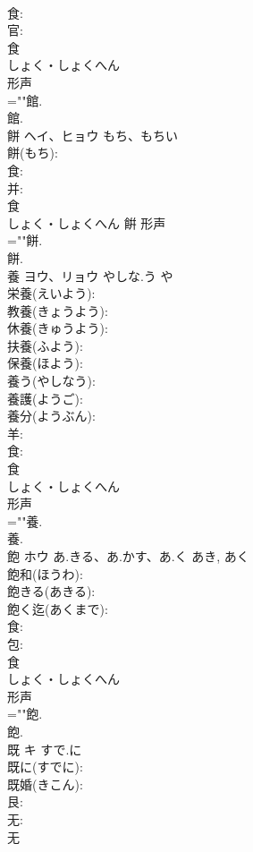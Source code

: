 \documentclass[8pt]{extreport}
\begin{document}
\begin{CJK}{UTF8}{min}
\\	食: 
\\	官: 
\\	食	
\\	しょく・しょくへん	
\\	形声 
\\	=""館.
\\	館.
\\	餅	ヘイ、ヒョウ	もち、もちい		
\\	餅(もち): 
\\	食: 
\\	并: 
\\	食	
\\	しょく・しょくへん	餠	形声 
\\	=""餅.
\\	餅.
\\	養	ヨウ、リョウ	やしな.う	や	
\\	栄養(えいよう): 
\\	教養(きょうよう): 
\\	休養(きゅうよう): 
\\	扶養(ふよう): 
\\	保養(ほよう): 
\\	養う(やしなう): 
\\	養護(ようご): 
\\	養分(ようぶん): 
\\	羊: 
\\	食: 
\\	食	
\\	しょく・しょくへん	
\\	形声 
\\	=""養.
\\	養.
\\	飽	ホウ	あ.きる、あ.かす、あ.く	あき, あく	
\\	飽和(ほうわ): 
\\	飽きる(あきる): 
\\	飽く迄(あくまで): 
\\	食: 
\\	包: 
\\	食	
\\	しょく・しょくへん	
\\	形声 
\\	=""飽.
\\	飽.
\\	既	キ	すで.に		
\\	既に(すでに): 
\\	既婚(きこん): 
\\	艮: 
\\	无: 
\\	无	

\end{CJK}
\end{document}
